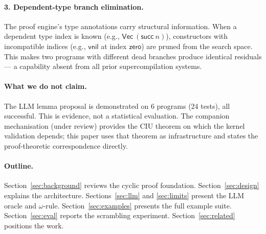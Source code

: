 \paragraph{3. Dependent-type branch elimination.}
The proof engine's type annotations carry structural information.  When a
dependent type index is known (e.g., $\mathsf{Vec}\ (\mathsf{succ}\ n)$),
constructors with incompatible indices (e.g., $\mathsf{vnil}$ at index
$\mathsf{zero}$) are pruned from the search space.  This makes two programs
with different dead branches produce identical residuals --- a capability
absent from all prior supercompilation systems.

\paragraph{What we do not claim.}
The LLM lemma proposal is demonstrated on 6 programs (24 tests), all
successful.  This is evidence, not a statistical evaluation.  The companion
mechanisation (under review) provides the CIU theorem on which the kernel
validation depends; this paper uses that theorem as infrastructure and
states the proof-theoretic correspondence directly.

\paragraph{Outline.}
Section~\ref{sec:background} reviews the cyclic proof foundation.
Section~\ref{sec:design} explains the architecture.
Sections~\ref{sec:llm} and \ref{sec:limits} present the LLM oracle and
$\omega$-rule.  Section~\ref{sec:examples} presents the full example suite.
Section~\ref{sec:eval} reports the scrambling experiment.
Section~\ref{sec:related} positions the work.
